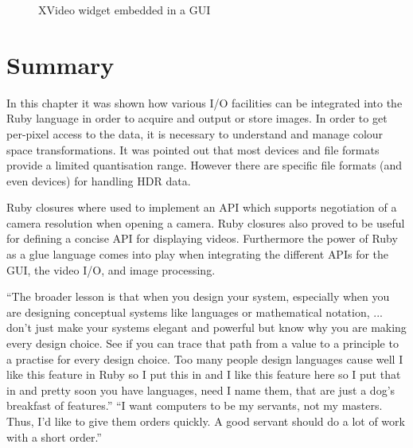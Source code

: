 \documentclass[12pt,a4paper,oneside,openright]{book}
\begin{document}
\begin{CJK}{UTF8}{}
\begin{figure}[htbp]
\begin{center}
    \caption{XVideo widget embedded in a \acs{GUI}\label{fig:xvwidget}}
  \end{center}
\end{figure}

\section{Summary}\label{cha:sumio}
In this chapter it was shown how various \ac{I}/\ac{O} facilities can be integrated into the Ruby language in order to acquire and output or store images. In order to get per-pixel access to the data, it is necessary to understand and manage colour space transformations. It was pointed out that most devices and file formats provide a limited quantisation range. However there are specific file formats (and even devices) for handling \ac{HDR} data.

Ruby closures where used to implement an \ac{API} which supports negotiation of a camera resolution when opening a camera. Ruby closures also proved to be useful for defining a concise \ac{API} for displaying videos. Furthermore the power of Ruby as a glue language comes into play when integrating the different \acp{API} for the \ac{GUI}, the video \ac{I}/\ac{O}, and image processing.

\begin{savequote}[8cm]
  \begin{singlespace}
    ``The broader lesson is that when you design your system, especially when you are designing conceptual systems like languages or mathematical notation, ... don't just make your systems elegant and powerful but know why you are making every design choice. See if you can trace that path from a value to a principle to a practise for every design choice. Too many people design languages cause well I like this feature in Ruby so I put this in and I like this feature here so I put that in and pretty soon you have languages, need I name them, that are just a dog's breakfast of features.''
    ``I want computers to be my servants, not my masters. Thus, I’d like to give them orders quickly. A good servant should do a lot of work with a short order.''
  \end{singlespace}
\end{savequote}

\end{CJK}
\end{document}
